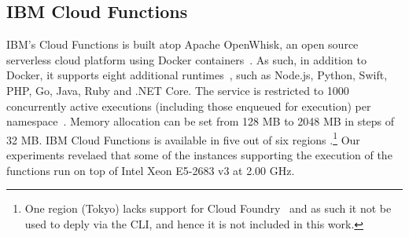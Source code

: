 
\subsection{IBM Cloud Functions}\label{sec:ss:ibm}

\gls{IBM}'s Cloud Functions \cite{IBMFunctions} is built atop Apache OpenWhisk, an open source serverless cloud platform using Docker containers~\cite{OpenWhisk}. 
As such, in addition to Docker, it supports eight additional runtimes~\cite{IBMRuntimes}, such as Node.js, Python, Swift, PHP, Go, Java, Ruby and .NET Core.
The service is restricted to 1000 concurrently active executions (including those enqueued for execution) per namespace~\cite{IBMLimits}. 
Memory allocation can be set from 128 \gls{MB} to 2048 \gls{MB} in steps of 32 \gls{MB}. 
\gls{IBM} Cloud Functions is available in five out of six regions \cite{IBMLocations}.\footnote{One region (Tokyo) lacks support for Cloud Foundry~\cite{IBMCloudFoundry} and as such it not be used to deply via the \gls{CLI}, and hence it is not included in this work.} 
Our experiments revelaed that some of the  instances supporting the execution of the functions run on top of Intel Xeon E5-2683 v3 at 2.00 \gls{GHz}.



